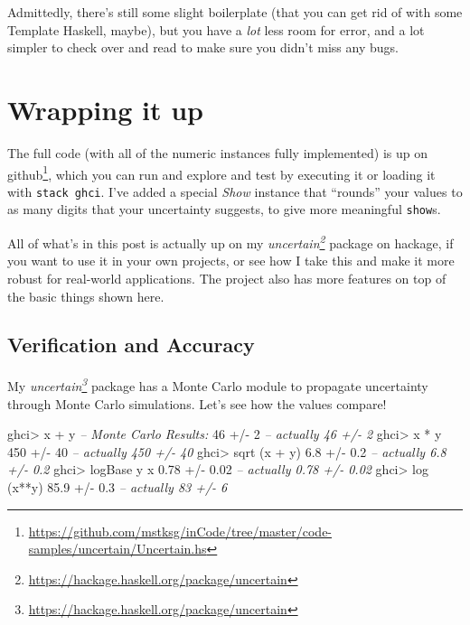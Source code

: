 \documentclass[]{article}
\newenvironment{Shaded}{}{}
\newcommand{\CommentTok}[1]{\textcolor[rgb]{0.38,0.63,0.69}{\textit{#1}}}
\newcommand{\DecValTok}[1]{\textcolor[rgb]{0.25,0.63,0.44}{#1}}
\newcommand{\FloatTok}[1]{\textcolor[rgb]{0.25,0.63,0.44}{#1}}
\newcommand{\FunctionTok}[1]{\textcolor[rgb]{0.02,0.16,0.49}{#1}}
\newcommand{\NormalTok}[1]{#1}
\renewcommand{\href}[2]{#2\footnote{\url{#1}}}
\begin{document}
Admittedly, there's still some slight boilerplate (that you can get rid of with
some Template Haskell, maybe), but you have a \emph{lot} less room for error,
and a lot simpler to check over and read to make sure you didn't miss any bugs.

\hypertarget{wrapping-it-up}{%
\section{Wrapping it up}\label{wrapping-it-up}}

The full code (with all of the numeric instances fully implemented) is up
\href{https://github.com/mstksg/inCode/tree/master/code-samples/uncertain/Uncertain.hs}{on
github}, which you can run and explore and test by executing it or loading it
with \texttt{stack\ ghci}. I've added a special \emph{Show} instance that
``rounds'' your values to as many digits that your uncertainty suggests, to give
more meaningful \texttt{show}s.

All of what's in this post is actually up on my
\emph{\href{https://hackage.haskell.org/package/uncertain}{uncertain}} package
on hackage, if you want to use it in your own projects, or see how I take this
and make it more robust for real-world applications. The project also has more
features on top of the basic things shown here.

\hypertarget{verification-and-accuracy}{%
\subsection{Verification and Accuracy}\label{verification-and-accuracy}}

My \emph{\href{https://hackage.haskell.org/package/uncertain}{uncertain}}
package has a Monte Carlo module to propagate uncertainty through Monte Carlo
simulations. Let's see how the values compare!

\begin{Shaded}
\begin{Highlighting}[]
\NormalTok{ghci}\FunctionTok{>}\NormalTok{ x }\FunctionTok{+}\NormalTok{ y         }\CommentTok{-- Monte Carlo Results:}
\DecValTok{46} \FunctionTok{+/-} \DecValTok{2}            \CommentTok{-- actually 46 +/- 2}
\NormalTok{ghci}\FunctionTok{>}\NormalTok{ x }\FunctionTok{*}\NormalTok{ y}
\DecValTok{450} \FunctionTok{+/-} \DecValTok{40}          \CommentTok{-- actually 450 +/- 40}
\NormalTok{ghci}\FunctionTok{>}\NormalTok{ sqrt (x }\FunctionTok{+}\NormalTok{ y)}
\FloatTok{6.8} \FunctionTok{+/-} \FloatTok{0.2}         \CommentTok{-- actually 6.8 +/- 0.2}
\NormalTok{ghci}\FunctionTok{>}\NormalTok{ logBase y x}
\FloatTok{0.78} \FunctionTok{+/-} \FloatTok{0.02}       \CommentTok{-- actually 0.78 +/- 0.02}
\NormalTok{ghci}\FunctionTok{>}\NormalTok{ log (x}\FunctionTok{**}\NormalTok{y)}
\FloatTok{85.9} \FunctionTok{+/-} \FloatTok{0.3}        \CommentTok{-- actually 83 +/- 6}
\end{Highlighting}
\end{Shaded}
\end{document}
